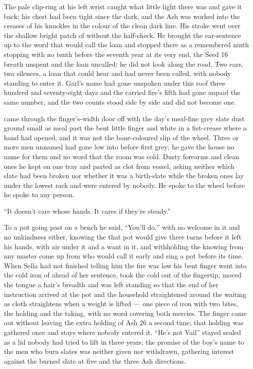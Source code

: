 The pale clip-ring at his left wrist caught what little light there was and gave it back; his chest had been tight since the dark, and the Ash was worked into the creases of his knuckles in the colour of the clean dark line. His stroke went over the shallow bright patch of  without the half-check. He brought the ear-sentence up to the word that would call the loan and stopped there as a remembered ninth stopping with no tenth before the seventh year at its very end, the Seed 16 breath unspent and the loan uncalled; he did not look along the road. Two ears, two silences, a loan that could hear and had never been called, with nobody standing to enter it. Garl's name had gone unspoken under this roof three hundred and seventy-eight days and the carried fire's fifth had gone unpaid the same number, and the two counts stood side by side and did not become one.

 came through the finger's-width door off  with the day's meal-fine grey slate dust ground small as meal past the bent little finger and white in a fist-crease where a hand had opened, and it was not the bone-coloured slip of the wheel. Three or more men unnamed had gone low into  before first grey; he gave the house no name for them and no word that the room was cold. Dusty forearms and clean ones he kept on one tray and parted as clot from vessel, asking neither which slate had been broken nor whether it was a birth-slate while the broken ones lay under the lowest rack and were entered by nobody. He spoke to the wheel before he spoke to any person.

“It doesn't care whose hands. It cares if they're steady.”

To a pot going past on a bench he said, “You'll do,” with no welcome in it and no unkindness either, knowing the  that pot would give three turns before it left his hands, with air under it and a want in it, and withholding the knowing from any master come up from  who would call it early and sing a pot before its time. When Sella had not finished telling him the fire was low his bent finger went into the cold iron of  ahead of her sentence, took the cold out of the fingertip, moved the tongue a hair's breadth and was left standing so that the end of her instruction arrived at the pot and the household straightened around the waiting as cloth straightens when a weight is lifted — one piece of iron with two bites, the holding and the taking, with no  word covering both mercies. The finger came out without leaving the extra holding of Ash 26 a second time; that holding was gathered once and stays where nobody entered it. “He's not Vail” stayed sealed as a lid nobody had tried to lift in three years; the promise of the boy's name to the men who burn slates was neither given nor withdrawn, gathering interest against the burned slate at five and the three Ash directions.

